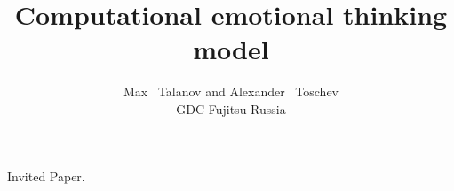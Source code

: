 \documentclass{apa6e}
\title{Computational emotional thinking model}
\author{Max ~Talanov and Alexander ~Toschev\\GDC Fujitsu Russia}
\begin{document}
\begin{center}
Invited Paper.\\
\end{center} 
\maketitle


\end{document}
